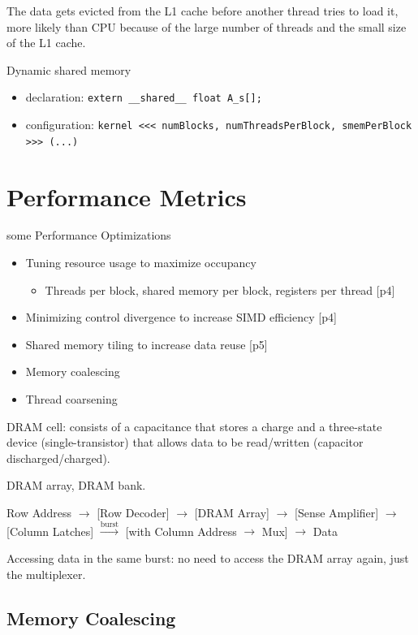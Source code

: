 \documentclass{article}
\begin{document}
The data gets evicted from the L1 cache before another thread tries to load it, more likely than CPU because of the large number of threads and the small size of the L1 cache.


Dynamic shared memory

\begin{itemize}
\item declaration: \texttt{extern \_\_shared\_\_ float A\_s[];}
\item configuration: \texttt{kernel <<< numBlocks, numThreadsPerBlock, smemPerBlock >>> (...)}
\end{itemize}

\section{Performance Metrics}
some Performance Optimizations


\begin{itemize}
\item Tuning resource usage to maximize occupancy
\begin{itemize}
\item Threads per block, shared memory per block, registers per thread [p4]
\end{itemize}
\item Minimizing control divergence to increase SIMD efficiency [p4]
\item Shared memory tiling to increase data reuse [p5]
\item Memory coalescing
\item Thread coarsening

\end{itemize}
DRAM cell: consists of a capacitance that stores a charge and a three-state device (single-transistor) that allows data to be read/written (capacitor discharged/charged).


DRAM array, DRAM bank.


Row Address $\to$ [Row Decoder] $\to$ [DRAM Array] $\to$ [Sense Amplifier] $\to$ [Column Latches] $\xrightarrow{\text{burst}}$ [with Column Address $\to$ Mux] $\to$ Data

Accessing data in the same burst: no need to access the DRAM array again, just the multiplexer.


\subsection{Memory Coalescing}
\end{document}
